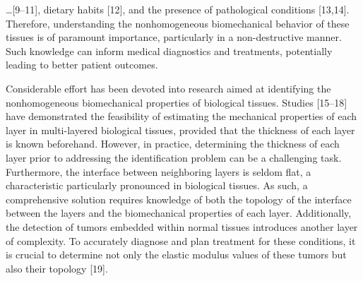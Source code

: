 \documentclass[11pt]{article}
\begin{document}
\noindent
\ldots{}[9--11], dietary habits [12], and the presence of pathological
conditions [13,14]. Therefore, understanding the nonhomogeneous
biomechanical behavior of these tissues is of paramount importance,
particularly in a non-destructive manner. Such knowledge can inform
medical diagnostics and treatments, potentially leading to better
patient outcomes.

Considerable effort has been devoted into research aimed at
identifying the nonhomogeneous biomechanical properties of biological
tissues. Studies [15--18] have demonstrated the feasibility of
estimating the mechanical properties of each layer in multi-layered
biological tissues, provided that the thickness of each layer is known
beforehand. However, in practice, determining the thickness of each
layer prior to addressing the identification problem can be a
challenging task. Furthermore, the interface between neighboring
layers is seldom flat, a characteristic particularly pronounced in
biological tissues. As such, a comprehensive solution requires
knowledge of both the topology of the interface between the layers
and the biomechanical properties of each layer. Additionally, the
detection of tumors embedded within normal tissues introduces another
layer of complexity. To accurately diagnose and plan treatment for
these conditions, it is crucial to determine not only the elastic
modulus values of these tumors but also their topology [19].
\end{document}
